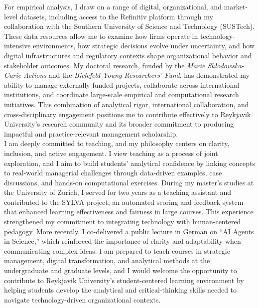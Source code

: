 \documentclass{nfr}
\begin{document}
For empirical analysis, I draw on a range of digital, organizational, and market-level datasets, including access to the Refinitiv platform through my collaboration with the Southern University of Science and Technology (SUSTech). 
These data resources allow me to examine how firms operate in technology-intensive environments, how strategic decisions evolve under uncertainty, and how digital infrastructures and regulatory contexts shape organizational behavior and stakeholder outcomes. 
My doctoral research, funded by the \textit{Marie Skłodowska-Curie Actions} and the \textit{Bielefeld Young Researchers’ Fund}, has demonstrated my ability to manage externally funded projects, collaborate across international institutions, and coordinate large-scale empirical and computational research initiatives. 
This combination of analytical rigor, international collaboration, and cross-disciplinary engagement positions me to contribute effectively to Reykjavik University’s research community and its broader commitment to producing impactful and practice-relevant management scholarship.\\

I am deeply committed to teaching, and my philosophy centers on clarity, inclusion, and active engagement. 
I view teaching as a process of joint exploration, and I aim to build students’ analytical confidence by linking concepts to real-world managerial challenges through data-driven examples, case discussions, and hands-on computational exercises. 
During my master’s studies at the University of Zurich, I served for two years as a teaching assistant and contributed to the SYLVA project, an automated scoring and feedback system that enhanced learning effectiveness and fairness in large courses. 
This experience strengthened my commitment to integrating technology with human-centered pedagogy. 
More recently, I co-delivered a public lecture in German on “AI Agents in Science,” which reinforced the importance of clarity and adaptability when communicating complex ideas. 
I am prepared to teach courses in strategic management, digital transformation, and analytical methods at the undergraduate and graduate levels, and I would welcome the opportunity to contribute to Reykjavik University’s student-centered learning environment by helping students develop the analytical and critical-thinking skills needed to navigate technology-driven organizational contexts.\\
\end{document}
